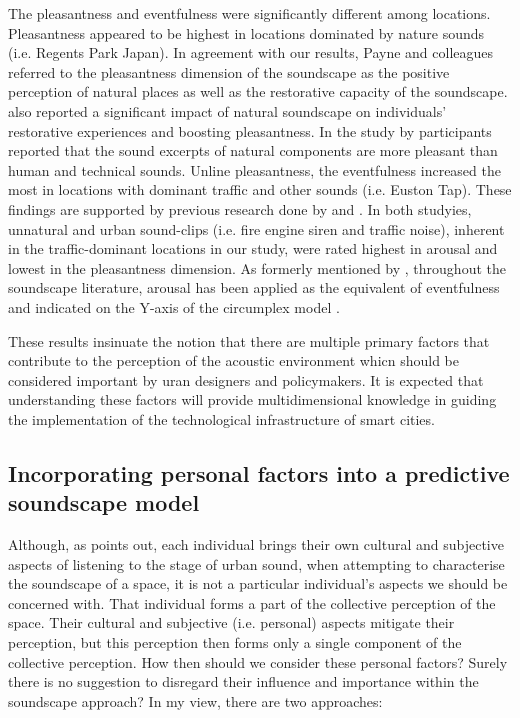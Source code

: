 The pleasantness and eventfulness were significantly different among locations. Pleasantness appeared to be highest in locations dominated by nature sounds (i.e. Regents Park Japan). In agreement with our results, Payne and colleagues  referred to the pleasantness dimension of the soundscape as the positive perception of natural places as well as the restorative capacity of the soundscape.  also reported a significant impact of natural soundscape on individuals' restorative experiences and boosting pleasantness. In the study by \citet{Axelsson2010principal} participants reported that the sound excerpts of natural components are more pleasant than human and technical sounds. Unline pleasantness, the eventfulness increased the most in locations with dominant traffic and other sounds (i.e. Euston Tap). These findings are supported by previous research done by  and \citet{Hume2013Physiological}. In both studyies, unnatural and urban sound-clips (i.e. fire engine siren and traffic noise), inherent in the traffic-dominant locations in our study, were rated highest in arousal and lowest in the pleasantness dimension. As formerly mentioned by \citet{Erfanian2019Psychophysiological}, throughout the soundscape literature, arousal has been applied as the equivalent of eventfulness and indicated on the Y-axis of the circumplex model \citep{Axelsson2010principal,Erfanian2019Psychophysiological}.

These results insinuate the notion that there are multiple primary factors  that contribute to the perception of the acoustic environment whicn should be considered important by uran designers and policymakers. It is expected that understanding these factors will provide multidimensional knowledge in guiding the implementation of the technological infrastructure of smart cities.



 \subsection{Incorporating personal factors into a predictive soundscape model}
Although, as \citet{Droumeva2021sound} points out, each individual brings their own cultural and subjective aspects of listening to the stage of urban sound, when attempting to characterise the soundscape of a space, it is not a particular individual's aspects we should be concerned with. That individual forms a part of the collective perception of the space. Their cultural and subjective (i.e. personal) aspects mitigate their perception, but this perception then forms only a single component of the collective perception. How then should we consider these personal factors? Surely there is no suggestion to disregard their influence and importance within the soundscape approach? In my view, there are two approaches:

